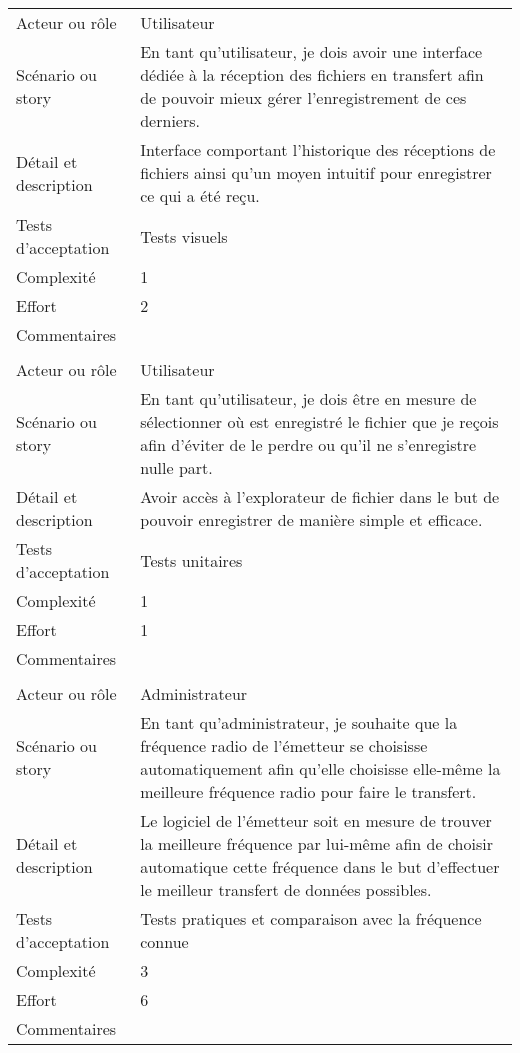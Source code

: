 \begin{longtable}{|l|p{}|}
\hline
    \rowcolor{Gray}
    \multicolumn{2}{|l|}{12} \\
\hline
    Acteur ou rôle & Utilisateur \\
\hline
    Scénario ou story & En tant qu'utilisateur,
          je dois avoir une interface dédiée à la réception des
          fichiers en transfert afin de pouvoir mieux gérer
          l'enregistrement de ces derniers.\\
\hline
    Détail et description & Interface comportant l'historique des réceptions de fichiers ainsi qu'un moyen intuitif pour enregistrer ce qui a été reçu.\\
\hline
    Tests d'acceptation & Tests visuels\\
\hline
    Complexité & 1 \\
\hline
    Effort & 2\\
\hline
    Commentaires &  \\

\hline
    \rowcolor{Gray}
    \multicolumn{2}{|l|}{13} \\
\hline
    Acteur ou rôle & Utilisateur \\
\hline
    Scénario ou story & En tant qu'utilisateur,
          je dois être en mesure de sélectionner où est enregistré
          le fichier que je reçois afin d'éviter de le perdre ou
          qu'il ne s'enregistre nulle part.\\
\hline
    Détail et description & Avoir accès à l'explorateur de fichier dans le but de pouvoir enregistrer de manière simple et efficace.\\
\hline
    Tests d'acceptation & Tests unitaires\\
\hline
    Complexité & 1 \\
\hline
    Effort & 1\\
\hline
    Commentaires &  \\

\hline
    \rowcolor{Gray}
    \multicolumn{2}{|l|}{14} \\
\hline
    Acteur ou rôle & Administrateur \\
\hline
    Scénario ou story & En tant qu'administrateur,
          je souhaite que la fréquence radio de l'émetteur se choisisse automatiquement
          afin qu'elle choisisse elle-même la meilleure fréquence radio pour faire le transfert.\\
\hline
    Détail et description & Le logiciel de l'émetteur soit en mesure de trouver la meilleure fréquence par lui-même afin de choisir automatique cette fréquence dans le but d'effectuer le meilleur transfert de données possibles.\\
\hline
    Tests d'acceptation & Tests pratiques et comparaison avec la fréquence connue\\
\hline
    Complexité & 3 \\
\hline
    Effort & 6\\
\hline
    Commentaires &  \\


\end{longtable}
